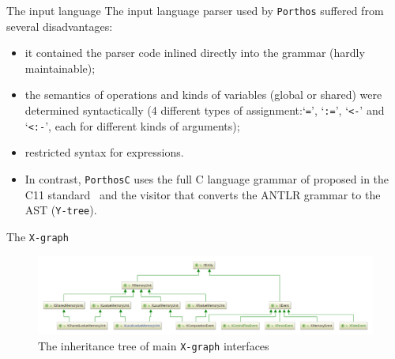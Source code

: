 \documentclass{beamer}
\begin{document}
\begin{frame}{The input language}
The input language parser used by \texttt{Porthos} suffered from several disadvantages:
\begin{itemize}
\item it contained the parser code inlined directly into the grammar (hardly maintainable);
\item the semantics of operations and kinds of variables (global or shared) were determined syntactically (4 different types of assignment:`\lstinline{=}', `\lstinline{:=}', `\lstinline{<-}' and `\lstinline{<:-}', each for different kinds of arguments);
\item restricted syntax for expressions.
\item In contrast, \texttt{PorthosC} uses the full C language grammar of proposed in the C11 standard~\cite{jtc2011sc22} and the visitor that converts the ANTLR grammar to the AST (\texttt{Y-tree}).
\end{itemize}

\end{frame}




\begin{frame}{The \texttt{X-graph}}
  \centering
  \begin{figure}
    \includegraphics[width=1.1\textwidth,keepaspectratio]{../img/my/class-diagrams/XEntity-interfaces.png}
    \caption{The inheritance tree of main \texttt{X-graph} interfaces}
  \end{figure}
  
\end{frame}
\end{document}
